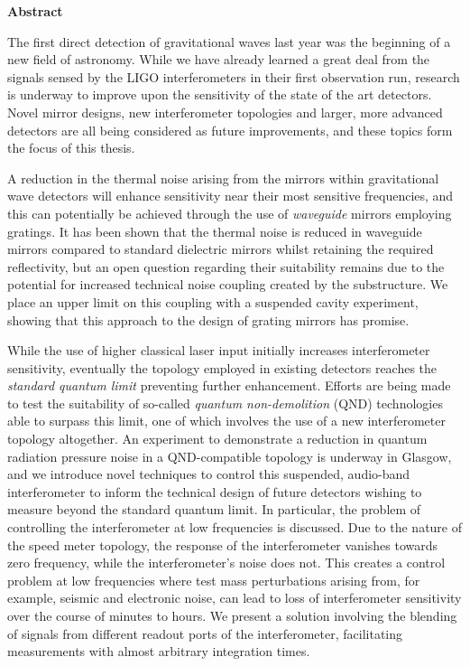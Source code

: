 \begin{center} {\bf Abstract}\end{center}

The first direct detection of gravitational waves last year was the beginning of a new field of astronomy. While we have already learned a great deal from the signals sensed by the LIGO interferometers in their first observation run, research is underway to improve upon the sensitivity of the state of the art detectors. Novel mirror designs, new interferometer topologies and larger, more advanced detectors are all being considered as future improvements, and these topics form the focus of this thesis.

A reduction in the thermal noise arising from the mirrors within gravitational wave detectors will enhance sensitivity near their most sensitive frequencies, and this can potentially be achieved through the use of \emph{waveguide} mirrors employing gratings. It has been shown that the thermal noise is reduced in waveguide mirrors compared to standard dielectric mirrors whilst retaining the required reflectivity, but an open question regarding their suitability remains due to the potential for increased technical noise coupling created by the substructure. We place an upper limit on this coupling with a suspended cavity experiment, showing that this approach to the design of grating mirrors has promise.

While the use of higher classical laser input initially increases interferometer sensitivity, eventually the \MI{} topology employed in existing detectors reaches the \emph{standard quantum limit} preventing further enhancement. Efforts are being made to test the suitability of so-called \emph{quantum non-demolition} (QND) technologies able to surpass this limit, one of which involves the use of a new interferometer topology altogether. An experiment to demonstrate a reduction in quantum radiation pressure noise in a QND-compatible \SSM{} topology is underway in Glasgow, and we introduce novel techniques to control this suspended, audio-band interferometer to inform the technical design of future detectors wishing to measure beyond the standard quantum limit. In particular, the problem of controlling the interferometer at low frequencies is discussed. Due to the nature of the speed meter topology, the response of the interferometer vanishes towards zero frequency, while the interferometer's noise does not. This creates a control problem at low frequencies where test mass perturbations arising from, for example, seismic and electronic noise, can lead to loss of interferometer sensitivity over the course of minutes to hours. We present a solution involving the blending of signals from different readout ports of the interferometer, facilitating measurements with almost arbitrary integration times.

